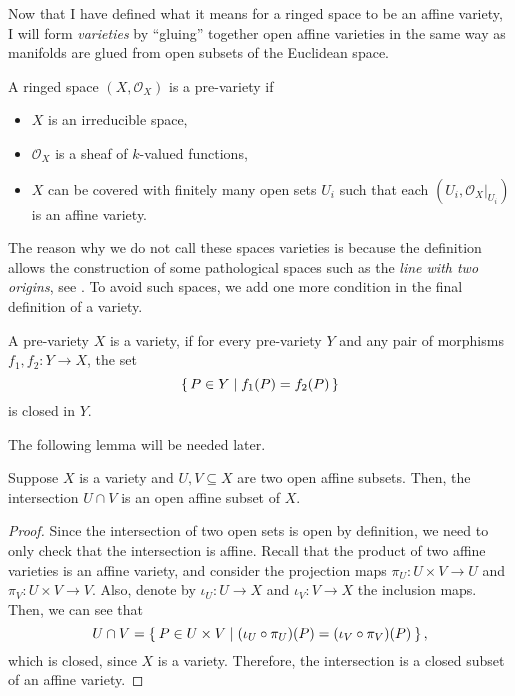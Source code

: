 Now that I have defined what it means for a ringed space to be an affine
variety, I will form \emph{varieties} by ``gluing'' together open affine varieties
in the same way as manifolds are glued from open subsets of the Euclidean
space.
\begin{defin}
  A ringed space $(X,\mathscr{O}_{X})$ is a pre-variety if
  \begin{itemize}
    \item $X$ is an irreducible space,
    \item $\mathscr{O}_{X}$ is a sheaf of $k$-valued functions,
    \item $X$ can be covered with finitely many open sets $U_{i}$
          such that each $(U_{i},\mathscr{O}_{X}\vert_{U_{i}})$ is
          an affine variety.
  \end{itemize}
\end{defin}
The reason why we do not call these spaces varieties
is because the definition allows the construction of some pathological
spaces such as the \emph{line with two origins}, see \cite{gathmann}.
To avoid such spaces, we add one more condition in the final definition
of a variety. %
\begin{defin}
  A pre-variety $X$ is a variety, if for every pre-variety $Y$ and any
  pair of morphisms $f_{1}, f_{2}: Y\to X$, the set
  \[\set{P\in Y\mid f_{1}(P)=f_{2}(P)}\]
  is closed in $Y$.
\end{defin}
The following lemma will be needed later.
\begin{lemm}%
  \label{lemm:affine_intersection}
  Suppose $X$ is a variety and $U, V\subseteq X$ are two open affine subsets.
  Then, the intersection $U\cap V$ is an open affine subset of $X$.
\end{lemm}
\begin{proof}
  Since the intersection of two open sets is open by definition,
  we need to only check that the intersection is affine.
  Recall that the product of two affine varieties is an
  affine variety, and consider the projection maps $\pi_U:U\times V\to U$
  and $\pi_V:U\times V\to V$. Also, denote by $\iota_U:U\to X$
  and $\iota_V:V\to X$ the inclusion maps. Then, we can see that
  \[
    U\cap V=\Set{P\in U\times V\mid (\iota_U\circ\pi_U)(P)=(\iota_V\circ\pi_V)(P)},
  \]
  which is closed, since $X$ is a variety.
  Therefore, the intersection is a closed subset of an
  affine variety.
\end{proof}

